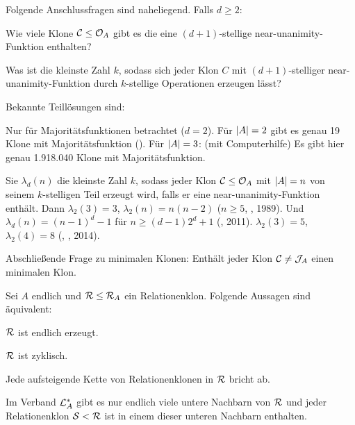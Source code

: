\documentclass{book}
\begin{document}
\begin{remark}
    Folgende Anschlussfragen sind naheliegend. Falls $d\geq 2$:
    \begin{statements}%
            \item Wie viele Klone $\mathcal{C}\leq\mathcal{O}_A$ gibt es die eine $(d+1)$-stellige near-unanimity-Funktion enthalten?
            \item Was ist die kleinste Zahl $k$, sodass sich jeder Klon $C$ mit $(d+1)$-stelliger near-unanimity-Funktion durch $k$-stellige Operationen erzeugen lässt?
    \end{statements}
    Bekannte Teillösungen sind:
    \begin{statements}
            \item Nur für Majoritätsfunktionen betrachtet ($d=2$). Für $\left|A\right|=2$ gibt es genau 19 Klone mit Majoritätsfunktion (). Für $\left|A\right|=3$: (mit Computerhilfe) Es gibt hier genau 1.918.040 Klone mit Majoritätsfunktion. 
            \item Sie $\lambda_d(n)$ die kleinste Zahl $k$, sodass jeder Klon $\mathcal{C}\leq \mathcal{O}_A$ mit $\left|A\right|=n$ von seinem $k$-stelligen Teil erzeugt wird, falls er eine near-unanimity-Funktion enthält. Dann $\lambda_2(3)=3$, $\lambda_2(n)=n(n-2)$ ($n\geq 5$, , 1989). Und $\lambda_d(n)={(n-1)}^d-1$ für $n\geq (d-1)2^d+1$ (, 2011). $\lambda_2(3)=5$, $\lambda_2(4)=8$ (, , 2014).
\end{statements}
Abschließende Frage zu minimalen Klonen: Enthält jeder Klon $\mathcal{C}\neq \mathcal{J}_A$ einen minimalen Klon.
\end{remark}

\begin{theorem}
    Sei $A$ endlich und $\mathcal{R}\leq\mathcal{R}_A$ ein Relationenklon. Folgende Aussagen sind äquivalent:
    \begin{statements}
            \item\label{rel-clo-fin-gen} $\mathcal{R}$ ist endlich erzeugt.
            \item\label{rel-clo-cyc} $\mathcal{R}$ ist zyklisch.
            \item\label{rel-clo-asc-ch} Jede aufsteigende Kette von Relationenklonen in $\mathcal{R}$ bricht ab.
            \item\label{rel-clo-fin-low-neigh} Im Verband $\mathcal{L}^{\ast}_A$ gibt es nur endlich viele untere Nachbarn von $\mathcal{R}$ und jeder Relationenklon $\mathcal{S} < \mathcal{R}$ ist in einem dieser unteren Nachbarn enthalten.
    \end{statements}
\end{theorem}
\end{document}
